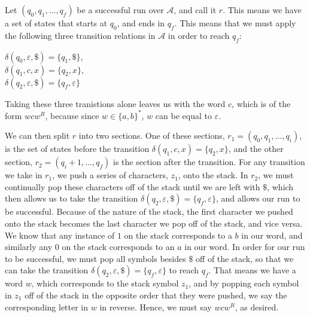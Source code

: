 \documentclass{article}
\begin{document}
Let $(q_0, q_1, \ldots, q_f)$ be a successful run over $\mathcal{A}$, and call it $r$. This means we have a set of states that starts at $q_0$, and ends in $q_f$. This means that we must apply the following three transition relations in $\mathcal{A}$ in order to reach $q_f$:

\begin{center}
$\delta(q_0, \varepsilon, \$) = \{q_1, \$\}$, \\
$\delta(q_1, c, x )= \{q_2, x\}$,\\ 
$\delta(q_2, \varepsilon, \$) = \{q_f, \varepsilon\}$
\end{center}

Taking these three tranistions alone leaves us with the word $c$, which is of the form $wcw^R$, because since $w \in \{a, b\}^*$, $w$ can be equal to $\varepsilon$. 

We can then split $r$ into two sections. One of these sections,  $r_1 = (q_0, q_1, \ldots, q_i)$, is the set of states before the transition $\delta(q_1, c, x )= \{q_2, x\}$, and the other section, $r_2 = (q_i+1, \ldots, q_f)$ is the section after the transition. For any transition we take in $r_1$, we push a series of characters, $z_1$, onto the stack. In $r_2$, we must continually pop these characters off of the stack until we are left with $\$$, which then allows us to take the transition $\delta(q_2, \varepsilon, \$) = \{q_f, \varepsilon\}$, and allows our run to be successful. Because of the nature of the stack, the first character we pushed onto the stack becomes the last character we pop off of the stack, and vice versa. We know that any instance of $1$ on the stack corresponds to a $b$ in our word, and similarly any $0$ on the stack corresponds to an $a$ in our word. In order for our run to be successful, we must pop all symbols besides $\$$ off of the stack, so that we can take the transition $\delta(q_2, \varepsilon, \$) = \{q_f, \varepsilon\}$ to reach $q_f$.  That means we have a word $w$, which corresponds to the stack symbol $z_1$, and by popping each symbol in $z_1$ off of the stack in the opposite order that they were pushed, we say the corresponding letter in $w$ in reverse. Hence, we must say $wcw^R$, as desired.
\end{document}
